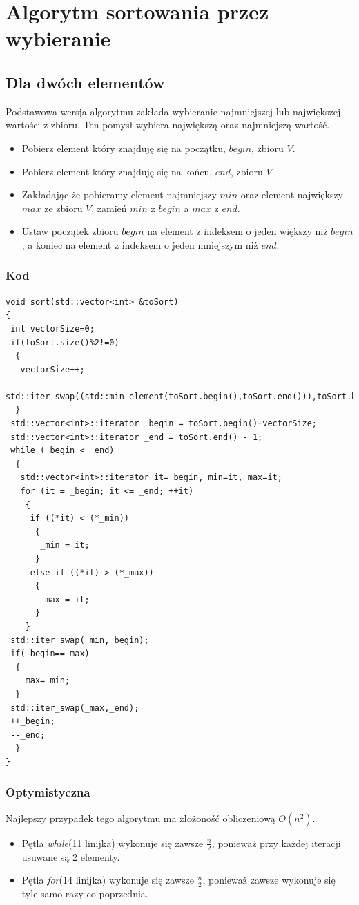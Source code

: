 \section{Algorytm sortowania przez wybieranie}
\subsection*{Dla dwóch elementów}
Podstawowa wersja algorytmu zakłada wybieranie najmniejszej lub największej wartości z zbioru. Ten pomysł wybiera największą oraz najmniejszą wartość.
\begin{itemize}
\item Pobierz element który znajduję się na początku, $begin$, zbioru $V$.
\item Pobierz element który znajduję się na końcu, $end$, zbioru $V$.
\item Zakładając że pobieramy element najmniejszy $min$ oraz element największy $max$ ze zbioru $V$, zamień $min$ z $begin$ a $max$ z $end$.
\item Ustaw początek zbioru $begin$ na element z indeksem o jeden większy niż $begin$, a koniec na element z indeksem o jeden mniejszym niż $end$.
\end{itemize}
 
\subsubsection*{Kod}
\begin{lstlisting}[caption={Sortowanie przez wybieranie dla par},label={lst:wybieranie}]
void sort(std::vector<int> &toSort)
{
 int vectorSize=0;
 if(toSort.size()%2!=0)
  {
   vectorSize++;
   std::iter_swap((std::min_element(toSort.begin(),toSort.end())),toSort.begin());
  }
 std::vector<int>::iterator _begin = toSort.begin()+vectorSize;
 std::vector<int>::iterator _end = toSort.end() - 1;
 while (_begin < _end)
  {
   std::vector<int>::iterator it=_begin,_min=it,_max=it;
   for (it = _begin; it <= _end; ++it)
    {
     if ((*it) < (*_min))
      {
       _min = it;
      }
     else if ((*it) > (*_max))
      {
       _max = it;
      }
    }
 std::iter_swap(_min,_begin);
 if(_begin==_max)
  {
   _max=_min;
  }
 std::iter_swap(_max,_end);
 ++_begin;
 --_end;
  }
}
\end{lstlisting}

\subsubsection*{Optymistyczna}
Najlepszy przypadek tego algorytmu ma złożoność obliczeniową $O(n^2)$. 
\begin{itemize}
\item Pętla \textit{while}(11 linijka) wykonuje się zawsze $\frac{n}{2}$, ponieważ przy każdej iteracji usuwane są 2 elementy.
\item Pętla \textit{for}(14 linijka) wykonuje się zawsze $\frac{n}{2}$, ponieważ zawsze wykonuje się tyle samo razy co poprzednia.
\end{itemize}

